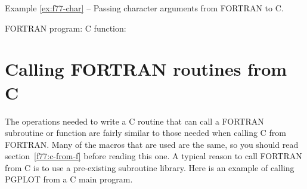 \label{ex:f77-char}
\begin{center}
Example \ref{ex:f77-char} -- Passing character arguments from FORTRAN to C.
\end{center}
\nopagebreak[4]
FORTRAN program:
\pagebreak[1]
C function:


\section{Calling FORTRAN routines from C}
\label{calling-c}

The operations needed to write a C routine that can call a FORTRAN subroutine
or function are fairly similar to those needed when calling C from FORTRAN.
Many of the macros that are used are the same, so you should read
section~\ref{f77:c-from-f} before reading this one. A typical reason to call
FORTRAN from C is to use a pre-existing subroutine library. Here is an example
of calling PGPLOT from a C main program.

